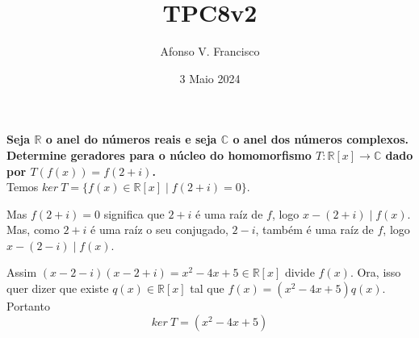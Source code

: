 \documentclass{article}
\title{TPC8v2}
\author{Afonso V. Francisco }
\date{3 Maio 2024}
\begin{document}
\maketitle

\textbf{Seja $\mathbb{R}$ o anel do números reais e seja $\mathbb{C}$ o anel dos números complexos. Determine geradores para o núcleo do homomorfismo $T: \mathbb{R}[x] \rightarrow \mathbb{C}$ dado por $T(f(x))=f(2+i)$.}\\

Temos $ker \ T= \{f(x) \in \mathbb{R}[x] \mid f(2+i)=0\}$.

Mas $f(2+i)=0$ significa que $2+i$ é uma raíz de $f$, logo $x-(2+i) \mid f(x)$. Mas, como $2+i$ é uma raíz o seu conjugado, $2-i$, também é uma raíz de $f$, logo $x-(2-i) \mid f(x)$.

Assim $(x-2-i)(x-2+i)=x^2-4x+5 \in \mathbb{R}[x]$ divide  $f(x)$. Ora, isso quer dizer que existe $q(x) \in \mathbb{R}[x]$ tal que $f(x)=(x^2-4x+5)q(x)$. Portanto $$ker\ T=(x^2-4x+5)$$
\end{document}
